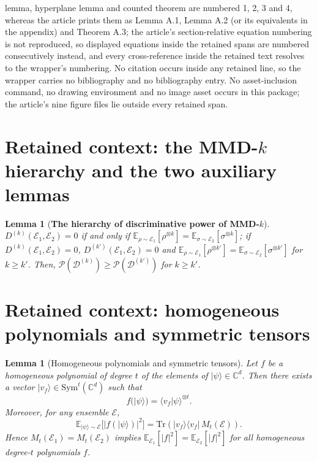 \documentclass[10pt,a4paper]{amsart}
\providecommand{\ket}[1]{|#1 \rangle}
\providecommand{\braket}[2]{\langle #1|#2 \rangle}
\newcommand{\dsE}{\mathbb{E}}
\newcommand{\scD}{\mathcal{D}}
\newcommand{\scE}{\mathcal{E}}
\newcommand{\scP}{\mathcal{P}}
\theoremstyle{plain}
\newtheorem{lemma}[theorem]{Lemma}
\theoremstyle{definition}
\theoremstyle{remark}
\begin{document}
lemma, hyperplane lemma and counted theorem are numbered 1, 2, 3 and 4, whereas the article prints them as Lemma A.1, Lemma A.2 (or its equivalents in the appendix) and Theorem A.3; the article's section-relative equation numbering is not reproduced, so displayed equations inside the retained spans are numbered consecutively instead, and every cross-reference inside the retained text resolves to the wrapper's numbering. No citation occurs inside any retained line, so the wrapper carries no bibliography and no bibliography entry. No asset-inclusion command, no drawing environment and no image asset occurs in this package; the article's nine figure files lie outside every retained span.

\section*{Retained context: the MMD-$k$ hierarchy and the two auxiliary lemmas}

\begin{lemma}[\textbf{The hierarchy of discriminative power of MMD-$k$}]
    $D^{(k)}(\scE_1,\scE_2)=0$ if and only if $\dsE_{\rho\sim\scE_1}[\rho^{\otimes k}] = \dsE_{\sigma\sim\scE_2}[\sigma^{\otimes k}]$; if $D^{(k)}(\scE_1,\scE_2)=0$, $D^{(k')}(\scE_1,\scE_2)=0$ and $\dsE_{\rho\sim\scE_1}[\rho^{\otimes k'}] = \dsE_{\sigma\sim\scE_2}[\sigma^{\otimes k'}]$ for $k \ge k'$. Then, $\scP(\scD^{(k)})\ge\scP(\scD^{(k')})$ for $k\ge k'$. \label{thm: hierarachy of MMD-k}
\end{lemma}


\section*{Retained context: homogeneous polynomials and symmetric tensors}

\begin{lemma}[Homogeneous polynomials and symmetric tensors]
Let $f$ be a homogeneous polynomial of degree $t$ of the elements of $\ket{\psi}\in\mathbb C^d$.
Then there exists a vector $\lvert v_f\rangle \in \mathrm{Sym}^t(\mathbb C^d)$ such that
\begin{equation}
f(\ket{\psi}) = \braket{v_f}{\psi}^{\otimes t}.
\label{eq:app-polynomial-tensor-representation}
\end{equation}
Moreover, for any ensemble $\mathcal E$,
\begin{equation}
\dsE_{\ket{\psi}\sim\mathcal E}\bigl[\lvert f(\ket{\psi})\rvert^2\bigr]
=
\mathrm{Tr}\!\left( \lvert v_f\rangle\langle v_f\rvert \, M_t(\mathcal E)\right).
\label{eq:app-polynomial-moment-identity}
\end{equation}
Hence $M_t(\mathcal E_1)=M_t(\mathcal E_2)$ implies
$\dsE_{\mathcal E_1}[\lvert f\rvert^2]=\dsE_{\mathcal E_2}[\lvert f\rvert^2]$
for all homogeneous degree-$t$ polynomials $f$. \label{lemma: homogeneous and sym}
\end{lemma}
\end{document}
